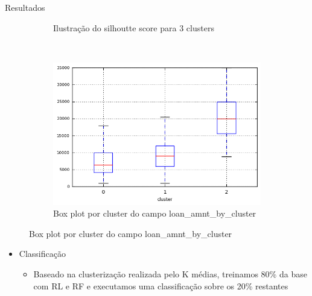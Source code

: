 \documentclass[final,hyperref={pdfpagelabels=false, brazil}]{beamer}
\let\olditem=\item%
\renewcommand{\item}{\olditem \justifying}%
\begin{document}
\begin{frame}[t]
\begin{columns}[t]
\begin{column}{.465\textwidth}
\begin{block}{Resultados}
\begin{itemize}
\begin{itemize}
\begin{figure}[t!]
\begin{subfigure}[t]{0.55\textwidth}
        \caption{Ilustração do silhoutte score para 3 clusters}
    \end{subfigure}%
    ~ 
    \begin{subfigure}[t]{0.35\textwidth}
        \centering
        \includegraphics[width=1\linewidth]{loan_amnt_by_cluster.png}
        \caption{Box plot por cluster do campo loan\_amnt\_by\_cluster}
    \end{subfigure}


\end{figure}



\end{itemize}

\end{itemize}

\begin{itemize}
\item Classificação

\begin{itemize}
\item Baseado na clusterização realizada pelo K médias, treinamos 80\% da base com RL e RF e executamos uma classificação sobre os 20\% restantes

\end{itemize}


    

\end{itemize}
\end{block}
\end{column}
\end{columns}
\end{frame}
\end{document}
